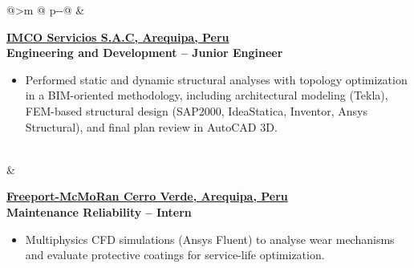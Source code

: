 \begin{tabular}{@{}>{\raggedleft\arraybackslash}m{\datecol} @{\hspace{\colgap}} p{\dimexpr\textwidth-\datecol-\colgap\relax}@{}}
 &
\begin{minipage}[t]{\linewidth}\vspace{0pt}
\begin{expblock}
  \footnotesize
  \setlength{\parindent}{0pt}\setlength{\parskip}{0pt}
  \textbf{\href{https://www.linkedin.com/company/imco-servicios-s-a-c/posts/?feedView=all}{IMCO Servicios S.A.C, Arequipa, Peru}}\\[-0.1em]
  \textbf{Engineering and Development – Junior Engineer}\\[-1em]
  \begin{itemize}[nosep,leftmargin=1em]
    \item Performed static and dynamic structural analyses with topology optimization in a BIM-oriented methodology, including architectural modeling (Tekla), FEM-based structural design (SAP2000, IdeaStatica, Inventor, Ansys Structural), and final plan review in AutoCAD 3D.

  \end{itemize}
\end{expblock}
\end{minipage}

\\[-0.5em]

 &
\begin{minipage}[t]{\linewidth}\vspace{0pt}
\begin{expblock}
  \footnotesize
  \setlength{\parindent}{0pt}\setlength{\parskip}{0pt}
    \textbf{\href{https://www.fcx.com}{Freeport-McMoRan Cerro Verde, Arequipa, Peru}}\\[-0.1em]
  \textbf{Maintenance Reliability – Intern}\\[-1em]
  \begin{itemize}[nosep,leftmargin=1em]
    \item Multiphysics CFD simulations (Ansys Fluent) to analyse wear mechanisms and evaluate protective coatings for service-life optimization.
 
  \end{itemize}
\end{expblock}
\end{minipage}

\end{tabular}